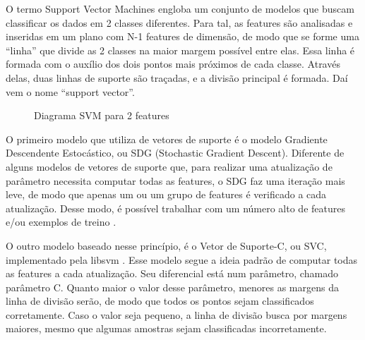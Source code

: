 O termo Support Vector Machines engloba um conjunto de modelos que buscam classificar os dados em 2 classes diferentes. Para tal, as features são analisadas e inseridas em um plano com N-1 features de dimensão, de modo que se forme uma “linha” que divide as 2 classes na maior margem possível entre elas. Essa linha é formada com o auxílio dos dois pontos mais próximos de cada classe. Através delas, duas linhas de suporte são traçadas, e a divisão principal é formada. Daí vem o nome “support vector”.

\begin{figure}[!htb]
    \caption{\label{fig:my-label} Diagrama SVM para 2 features}
\end{figure}

O primeiro modelo que utiliza de vetores de suporte é o modelo Gradiente Descendente Estocástico, ou SDG (Stochastic Gradient Descent). Diferente de alguns modelos de vetores de suporte que, para realizar uma atualização de parâmetro necessita computar todas as features, o SDG faz uma iteração mais leve, de modo que apenas um ou um grupo de features é verificado a cada atualização. Desse modo, é possível trabalhar com um número alto de features e/ou exemplos de treino \cite{scikit-learn}.

O outro modelo baseado nesse princípio, é o Vetor de Suporte-C, ou SVC, implementado pela libsvm \cite{libsvm}. Esse modelo segue a ideia padrão de computar todas as features a cada atualização. Seu diferencial está num parâmetro, chamado parâmetro C. Quanto maior o valor desse parâmetro, menores as margens da linha de divisão serão, de modo que todos os pontos sejam classificados corretamente. Caso o valor seja pequeno, a linha de divisão busca por margens maiores, mesmo que algumas amostras sejam classificadas incorretamente.

